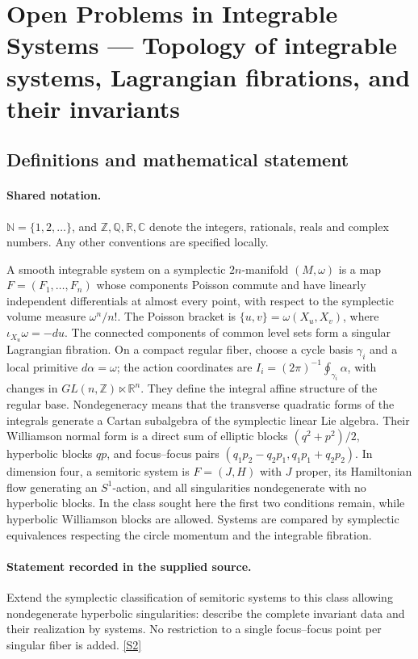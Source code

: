 \documentclass[11pt]{article}
\newcommand{\sref}[2]{\hyperlink{source:#1:#2}{[S#2]}}
\begin{document}
\section{Open Problems in Integrable Systems — Topology of integrable systems, Lagrangian fibrations, and their invariants}\label{statement}

\subsection{Definitions and mathematical statement}

\paragraph{Shared notation.}$\mathbb N=\{1,2,\ldots\}$, and $\mathbb Z,\mathbb Q,\mathbb R,\mathbb C$ denote the integers, rationals, reals and complex numbers. Any other conventions are specified locally.


A smooth integrable system on a symplectic $2n$-manifold $(M,\omega)$ is a map $F=(F_1,\ldots,F_n)$ whose components Poisson commute and have linearly independent differentials at almost every point, with respect to the symplectic volume measure $\omega^n/n!$. The Poisson bracket is $\{u,v\}=\omega(X_u,X_v)$, where $\iota_{X_u}\omega=-du$. The connected components of common level sets form a singular Lagrangian fibration. On a compact regular fiber, choose a cycle basis $\gamma_i$ and a local primitive $d\alpha=\omega$; the action coordinates are $I_i=(2\pi)^{-1}\oint_{\gamma_i}\alpha$, with changes in $GL(n,\mathbb Z)\ltimes\mathbb R^n$. They define the integral affine structure of the regular base. Nondegeneracy means that the transverse quadratic forms of the integrals generate a Cartan subalgebra of the symplectic linear Lie algebra. Their Williamson normal form is a direct sum of elliptic blocks $(q^2+p^2)/2$, hyperbolic blocks $qp$, and focus--focus pairs $(q_1p_2-q_2p_1,q_1p_1+q_2p_2)$. In dimension four, a semitoric system is $F=(J,H)$ with $J$ proper, its Hamiltonian flow generating an $S^1$-action, and all singularities nondegenerate with no hyperbolic blocks. In the class sought here the first two conditions remain, while hyperbolic Williamson blocks are allowed. Systems are compared by symplectic equivalences respecting the circle momentum and the integrable fibration.
\paragraph{Statement recorded in the supplied source.}
Extend the symplectic classification of semitoric systems to this class allowing nondegenerate hyperbolic singularities: describe the complete invariant data and their realization by systems. No restriction to a single focus--focus point per singular fiber is added. \sref{statement}{2}
\end{document}
